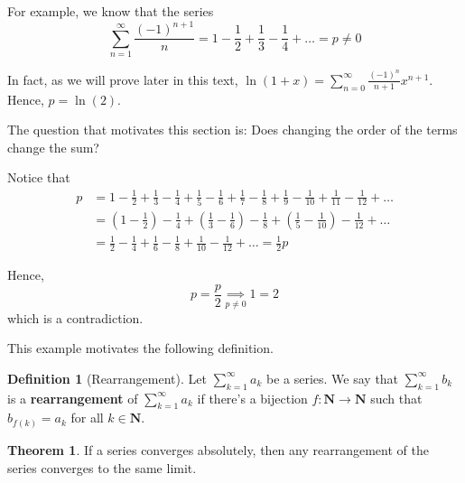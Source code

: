 \documentclass[tikz,12pt,a4paper]{article}
\theoremstyle{definition}
\newtheorem{theorem}{Theorem}[section]
\newtheorem{definition}{Definition}[section]
\begin{document}
For example, we know that the series \[ \sum_{n=1}^\infty \frac{(-1)^{n+1}}{n} = 1 - \frac{1}{2} + \frac{1}{3} - \frac{1}{4} + \ldots = p \neq 0 \]

In fact, as we will prove later in this text, $\ln (1+x) = \sum_{n=0}^\infty \frac{(-1)^{n}}{n+1} x^{n+1}$. Hence, $p = \ln (2)$.

The question that motivates this section is: Does changing the order of the terms change the sum?

Notice that
\begin{equation*}
	\begin{aligned}
		p &=  1 - \frac{1}{2} + \frac{1}{3} - \frac{1}{4} + \frac{1}{5} - \frac{1}{6} + \frac{1}{7} - \frac{1}{8} + \frac{1}{9} - \frac{1}{10} + \frac{1}{11} - \frac{1}{12} + \ldots \\
		&= \left( 1 - \frac{1}{2} \right) - \frac{1}{4} + \left( \frac{1}{3} - \frac{1}{6} \right) - \frac{1}{8} + \left( \frac{1}{5} - \frac{1}{10} \right) - \frac{1}{12} + \ldots \\
		&= \frac{1}{2} - \frac{1}{4} + \frac{1}{6} - \frac{1}{8} + \frac{1}{10} - \frac{1}{12} + \ldots = \frac{1}{2} p
	\end{aligned}
\end{equation*}

Hence,
\[
	p = \frac{p}{2} \underset{p \neq 0}{\implies} 1 = 2
\]
which is a contradiction.

This example motivates the following definition.

\begin{definition}[Rearrangement]
	Let $\sum_{k=1}^\infty a_k$ be a series. We say that $\sum_{k=1}^\infty b_k$ is a \textbf{rearrangement} of $\sum_{k=1}^\infty a_k$ if there's a bijection $f: \textbf{N} \longrightarrow \textbf{N}$ such that $b_{f(k)} = a_k$ for all $k \in \textbf{N}$.
\end{definition}

\begin{theorem}
	If a series converges absolutely, then any rearrangement of the series converges to the same limit.
\end{theorem}
\end{document}
